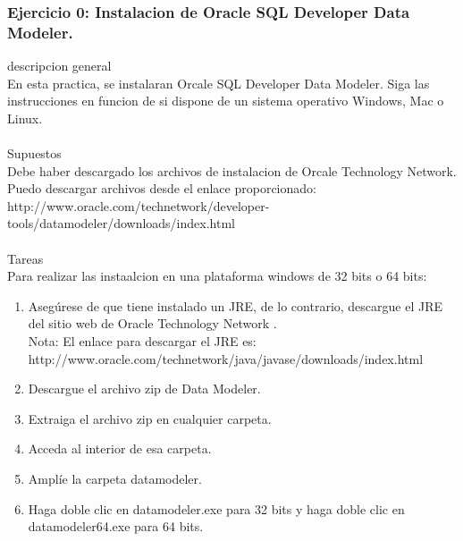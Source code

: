 \documentclass[12pt,letterpaper]{article}
\begin{document}
\subsubsection{Ejercicio 0: Instalacion de Oracle SQL Developer Data Modeler.}
		descripcion general  \\
En esta practica, se instalaran Orcale SQL Developer Data Modeler. Siga las instrucciones en funcion de si dispone de un sistema operativo Windows, Mac o Linux. \\
\\
Supuestos\\
Debe haber descargado los archivos de instalacion de Orcale Technology Network. Puedo descargar archivos desde el enlace proporcionado:
http://www.oracle.com/technetwork/developer-tools/datamodeler/downloads/index.html\\
\\
Tareas\\
Para realizar las instaalcion en una plataforma windows de 32 bits o 64 bits:
\begin{enumerate}[1.]
    \item Asegúrese de que tiene instalado un JRE, de lo contrario, descargue el JRE del sitio web de Oracle Technology Network .  \\
    Nota: El enlace para descargar el JRE es: http://www.oracle.com/technetwork/java/javase/downloads/index.html
    
   \item Descargue el archivo zip de Data Modeler.
   
   \item Extraiga el archivo zip en cualquier carpeta.
   
   \item Acceda al interior de esa carpeta.
   
    \item Amplíe la carpeta datamodeler.
    
    \item Haga doble clic en datamodeler.exe para 32 bits y haga doble clic en datamodeler64.exe para 64 bits.
   
		\end{enumerate} 
		
\end{document}
